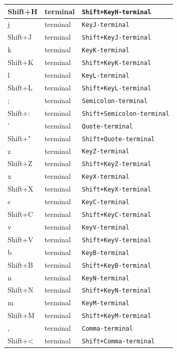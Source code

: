 \documentclass[11pt, a4paper]{article}
\begin{document}
\begin{appendices}
\begin{longtable}{|p{}|p{}|p{}|}
    Shift+H & terminal & \texttt{Shift+KeyH-terminal} \\ \hline
    j & terminal & \texttt{KeyJ-terminal} \\ \hline
    Shift+J & terminal & \texttt{Shift+KeyJ-terminal} \\ \hline
    k & terminal & \texttt{KeyK-terminal} \\ \hline
    Shift+K & terminal & \texttt{Shift+KeyK-terminal} \\ \hline
    l & terminal & \texttt{KeyL-terminal} \\ \hline
    Shift+L & terminal & \texttt{Shift+KeyL-terminal} \\ \hline
    ; & terminal & \texttt{Semicolon-terminal} \\ \hline
    Shift+: & terminal & \texttt{Shift+Semicolon-terminal} \\ \hline
    ' & terminal & \texttt{Quote-terminal} \\ \hline
    Shift+" & terminal & \texttt{Shift+Quote-terminal} \\ \hline
    z & terminal & \texttt{KeyZ-terminal} \\ \hline
    Shift+Z & terminal & \texttt{Shift+KeyZ-terminal} \\ \hline
    x & terminal & \texttt{KeyX-terminal} \\ \hline
    Shift+X & terminal & \texttt{Shift+KeyX-terminal} \\ \hline
    c & terminal & \texttt{KeyC-terminal} \\ \hline
    Shift+C & terminal & \texttt{Shift+KeyC-terminal} \\ \hline
    v & terminal & \texttt{KeyV-terminal} \\ \hline
    Shift+V & terminal & \texttt{Shift+KeyV-terminal} \\ \hline
    b & terminal & \texttt{KeyB-terminal} \\ \hline
    Shift+B & terminal & \texttt{Shift+KeyB-terminal} \\ \hline
    n & terminal & \texttt{KeyN-terminal} \\ \hline
    Shift+N & terminal & \texttt{Shift+KeyN-terminal} \\ \hline
    m & terminal & \texttt{KeyM-terminal} \\ \hline
    Shift+M & terminal & \texttt{Shift+KeyM-terminal} \\ \hline
    , & terminal & \texttt{Comma-terminal} \\ \hline
    Shift+< & terminal & \texttt{Shift+Comma-terminal} \\ \hline

\end{longtable}
\end{appendices}
\end{document}
